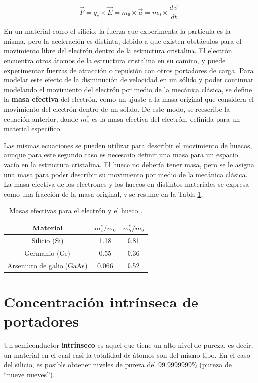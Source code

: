 \[ \vec{F} = q_e \times \vec{E} = m_0 \times \vec{a} = m_0 \times \dfrac{d\vec{v}}{dt} \]

En un material como el silicio, la fuerza que experimenta la partícula es la misma, pero la aceleración es distinta, debido a que existen obstáculos para el movimiento libre del electrón dentro de la estructura cristalina. El electrón encuentra otros átomos de la estructura cristalina en su camino, y puede experimentar fuerzas de atracción o repulsión con otros portadores de carga. Para modelar este efecto de la disminución de velocidad en un sólido y poder continuar modelando el movimiento del electrón por medio de la mecánica clásica, se define la \textbf{masa efectiva} del electrón, como un ajuste a la masa original que considera el movimiento del electrón dentro de un sólido. De este modo, se reescribe la ecuación anterior, donde $m_e^*$ es la masa efectiva del electrón, definida para un material específico.

Las mismas ecuaciones se pueden utilizar para describir el movimiento de huecos, aunque para este segundo caso es necesario definir una masa para un espacio vacío en la estructura cristalina. El hueco no debería tener masa, pero se le asigna una masa para poder describir su movimiento por medio de la mecánica clásica. La masa efectiva de los electrones y los huecos en distintos materiales se expresa como una fracción de la masa original, y se resume en la Tabla \ref{tabla_masas_efectivas}. 

\begin{table}[H]
    \centering
    \caption{Masas efectivas para el electrón y el hueco \cite{b7}.}
    \label{tabla_masas_efectivas}
    \begin{tabular}{|c|c|c|}
        \hline \textbf{Material} & \textbf{$m_e^*/m_0$} & \textbf{$m_h^*/m_0$} \\
        \hline Silicio (Si) & 1.18 & 0.81 \\
        Germanio (Ge) & 0.55 & 0.36 \\
        Arseniuro de galio (GaAs) & 0.066 & 0.52 \\
        \hline
    \end{tabular}
\end{table}


\section{Concentración intrínseca de portadores}

Un semiconductor \textbf{intrínseco} es aquel que tiene un alto nivel de pureza, es decir, un material en el cual casi la totalidad de átomos son del mismo tipo. En el caso del silicio, es posible obtener niveles de pureza del 99.9999999\% (pureza de ``nueve nueves'').

